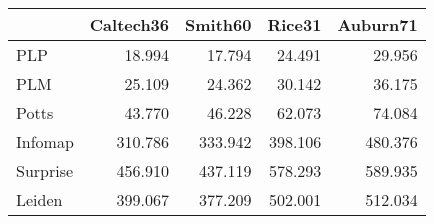 \begin{tabular}{lrrrr}
\toprule
{} & Caltech36 & Smith60 &  Rice31 & Auburn71 \\
\midrule
PLP      &    18.994 &  17.794 &  24.491 &   29.956 \\
PLM      &    25.109 &  24.362 &  30.142 &   36.175 \\
Potts    &    43.770 &  46.228 &  62.073 &   74.084 \\
Infomap  &   310.786 & 333.942 & 398.106 &  480.376 \\
Surprise &   456.910 & 437.119 & 578.293 &  589.935 \\
Leiden   &   399.067 & 377.209 & 502.001 &  512.034 \\
\bottomrule
\end{tabular}
